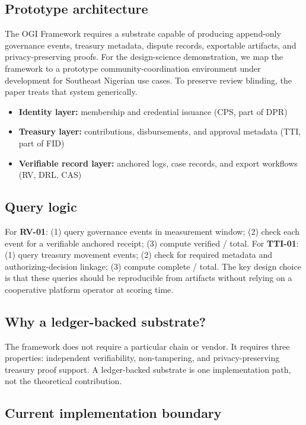 \documentclass[sigconf]{acmart}
\begin{document}
\subsection{Prototype architecture}

The OGI Framework requires a substrate capable of producing append-only governance events, treasury metadata, dispute records, exportable artifacts, and privacy-preserving proofs. For the design-science demonstration, we map the framework to a prototype community-coordination environment under development for Southeast Nigerian use cases. To preserve review blinding, the paper treats that system generically.

\begin{itemize}
\item \textbf{Identity layer:} membership and credential issuance (CPS, part of DPR)
\item \textbf{Treasury layer:} contributions, disbursements, and approval metadata (TTI, part of FID)
\item \textbf{Verifiable record layer:} anchored logs, case records, and export workflows (RV, DRL, CAS)
\end{itemize}

\subsection{Query logic}

For \textbf{RV-01}: (1) query governance events in measurement window; (2) check each event for a verifiable anchored receipt; (3) compute verified / total. For \textbf{TTI-01}: (1) query treasury movement events; (2) check for required metadata and authorizing-decision linkage; (3) compute complete / total. The key design choice is that these queries should be reproducible from artifacts without relying on a cooperative platform operator at scoring time.

\subsection{Why a ledger-backed substrate?}

The framework does not require a particular chain or vendor. It requires three properties: independent verifiability, non-tampering, and privacy-preserving treasury proof support. A ledger-backed substrate is one implementation path, not the theoretical contribution.

\subsection{Current implementation boundary}
\end{document}
